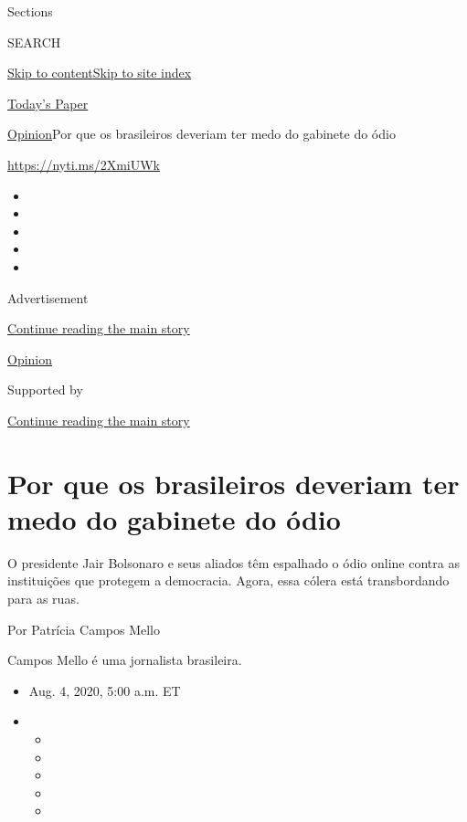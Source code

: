 Sections

SEARCH

\protect\hyperlink{site-content}{Skip to
content}\protect\hyperlink{site-index}{Skip to site index}

\href{https://myaccount.nytimes3xbfgragh.onion/auth/login?response_type=cookie\&client_id=vi}{}

\href{https://www.nytimes3xbfgragh.onion/section/todayspaper}{Today's
Paper}

\href{/section/opinion}{Opinion}\textbar{}Por que os brasileiros
deveriam ter medo do gabinete do ódio

\url{https://nyti.ms/2XmiUWk}

\begin{itemize}
\item
\item
\item
\item
\item
\end{itemize}

Advertisement

\protect\hyperlink{after-top}{Continue reading the main story}

\href{/section/opinion}{Opinion}

Supported by

\protect\hyperlink{after-sponsor}{Continue reading the main story}

\hypertarget{por-que-os-brasileiros-deveriam-ter-medo-do-gabinete-do-uxf3dio}{%
\section{Por que os brasileiros deveriam ter medo do gabinete do
ódio}\label{por-que-os-brasileiros-deveriam-ter-medo-do-gabinete-do-uxf3dio}}

O presidente Jair Bolsonaro e seus aliados têm espalhado o ódio online
contra as instituições que protegem a democracia. Agora, essa cólera
está transbordando para as ruas.

Por Patrícia Campos Mello

Campos Mello é uma jornalista brasileira.

\begin{itemize}
\item
  Aug. 4, 2020, 5:00 a.m. ET
\item
  \begin{itemize}
  \item
  \item
  \item
  \item
  \item
  \end{itemize}
\end{itemize}

